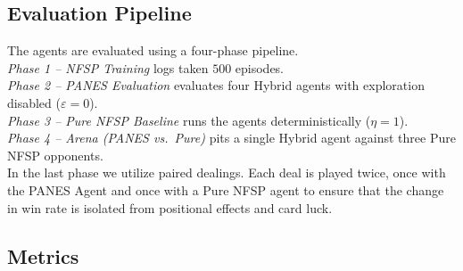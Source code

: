 \documentclass[conference]{IEEEtran}
\begin{document}
\begin{table}[htbp]
\centering
\caption{\normalsize Training Hyperparameters}
\label{tab:hyperparams}
\end{table}
 
\subsection{\textbf{Evaluation Pipeline}}
 The agents are evaluated using a four-phase pipeline. \\
 \textit{Phase 1 -- NFSP Training} logs taken $500$ episodes.\\ 
 \textit{Phase 2 -- PANES Evaluation} evaluates four Hybrid agents with exploration disabled ($\varepsilon=0$). \\
 \textit{Phase 3 -- Pure NFSP Baseline} runs the agents deterministically ($\eta=1$). \\
 \textit{Phase 4 -- Arena (PANES vs.\ Pure)} pits a single Hybrid agent against three Pure NFSP opponents.\\
 In the last phase we utilize paired dealings. Each deal is played twice, once with the PANES Agent and once with a Pure NFSP agent to ensure that the change in win rate is isolated from positional effects and card luck.
 
\subsection{\textbf{Metrics}}
 
\end{document}
